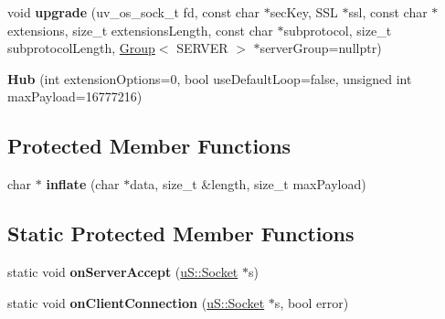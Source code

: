 \begin{DoxyCompactItemize}
\item 
\mbox{\label{structu_w_s_1_1_hub_a423b9cf066ba3a8becf1cc1ec2c34108}} 
void {\bfseries upgrade} (uv\+\_\+os\+\_\+sock\+\_\+t fd, const char $\ast$sec\+Key, S\+SL $\ast$ssl, const char $\ast$extensions, size\+\_\+t extensions\+Length, const char $\ast$subprotocol, size\+\_\+t subprotocol\+Length, \mbox{\hyperlink{structu_w_s_1_1_group}{Group}}$<$ S\+E\+R\+V\+ER $>$ $\ast$server\+Group=nullptr)
\item 
\mbox{\label{structu_w_s_1_1_hub_a1ccbc2d39524e675affd22c851dffd4a}} 
{\bfseries Hub} (int extension\+Options=0, bool use\+Default\+Loop=false, unsigned int max\+Payload=16777216)
\end{DoxyCompactItemize}
\subsection*{Protected Member Functions}
\begin{DoxyCompactItemize}
\item 
\mbox{\label{structu_w_s_1_1_hub_a7b622380cf7b4f9d03d41848dbaab0d9}} 
char $\ast$ {\bfseries inflate} (char $\ast$data, size\+\_\+t \&length, size\+\_\+t max\+Payload)
\end{DoxyCompactItemize}
\subsection*{Static Protected Member Functions}
\begin{DoxyCompactItemize}
\item 
\mbox{\label{structu_w_s_1_1_hub_a994681f1492339cb94f7ba9c69724821}} 
static void {\bfseries on\+Server\+Accept} (\mbox{\hyperlink{structu_s_1_1_socket}{u\+S\+::\+Socket}} $\ast$s)
\item 
\mbox{\label{structu_w_s_1_1_hub_a6f082fdce9ac8593c78c81ef5a9ac2b8}} 
static void {\bfseries on\+Client\+Connection} (\mbox{\hyperlink{structu_s_1_1_socket}{u\+S\+::\+Socket}} $\ast$s, bool error)
\end{DoxyCompactItemize}

